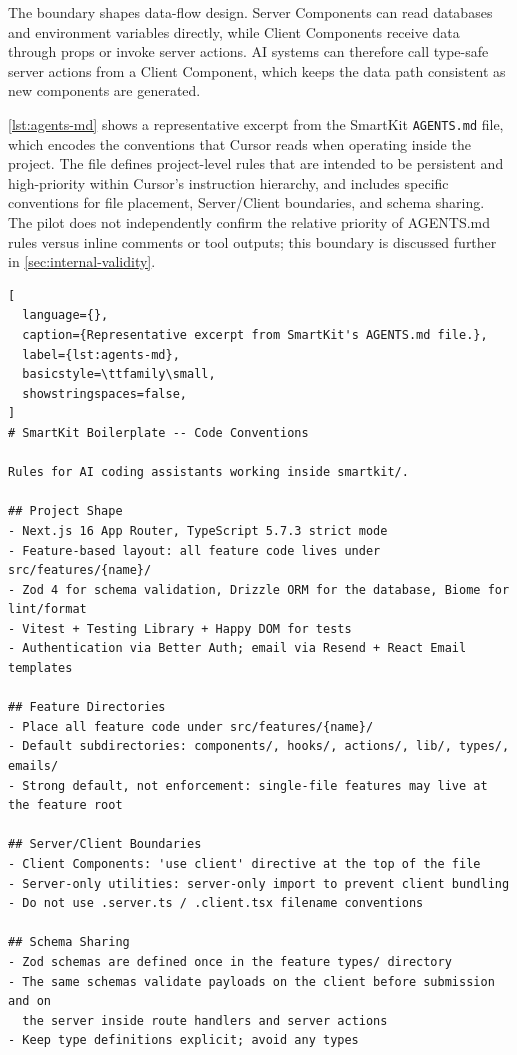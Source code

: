 \documentclass[12pt,a4paper]{report}
\DeclareRobustCommand{\filename}[1]{\bgroup\urlstyle{tt}\nolinkurl{#1}\egroup}
\begin{document}
The boundary shapes data-flow design. Server Components can read databases and environment variables directly, while Client Components receive data through props or invoke server actions. AI systems can therefore call type-safe server actions from a Client Component, which keeps the data path consistent as new components are generated.

\autoref{lst:agents-md} shows a representative excerpt from the SmartKit \filename{AGENTS.md} file, which encodes the conventions that Cursor reads when operating inside the project. The file defines project-level rules that are intended to be persistent and high-priority within Cursor's instruction hierarchy, and includes specific conventions for file placement, Server/Client boundaries, and schema sharing. The pilot does not independently confirm the relative priority of AGENTS.md rules versus inline comments or tool outputs; this boundary is discussed further in \autoref{sec:internal-validity}.

\begin{lstlisting}[
  language={},
  caption={Representative excerpt from SmartKit's AGENTS.md file.},
  label={lst:agents-md},
  basicstyle=\ttfamily\small,
  showstringspaces=false,
]
# SmartKit Boilerplate -- Code Conventions

Rules for AI coding assistants working inside smartkit/.

## Project Shape
- Next.js 16 App Router, TypeScript 5.7.3 strict mode
- Feature-based layout: all feature code lives under src/features/{name}/
- Zod 4 for schema validation, Drizzle ORM for the database, Biome for lint/format
- Vitest + Testing Library + Happy DOM for tests
- Authentication via Better Auth; email via Resend + React Email templates

## Feature Directories
- Place all feature code under src/features/{name}/
- Default subdirectories: components/, hooks/, actions/, lib/, types/, emails/
- Strong default, not enforcement: single-file features may live at the feature root

## Server/Client Boundaries
- Client Components: 'use client' directive at the top of the file
- Server-only utilities: server-only import to prevent client bundling
- Do not use .server.ts / .client.tsx filename conventions

## Schema Sharing
- Zod schemas are defined once in the feature types/ directory
- The same schemas validate payloads on the client before submission and on
  the server inside route handlers and server actions
- Keep type definitions explicit; avoid any types
\end{lstlisting}
\end{document}
